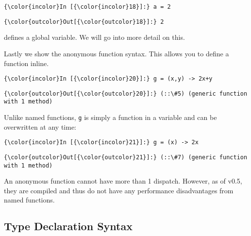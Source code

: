 \documentclass[11pt]{article}
\begin{document}
    \begin{Verbatim}[commandchars=\\\{\}]
{\color{incolor}In [{\color{incolor}18}]:} a = 2
\end{Verbatim}

            \begin{Verbatim}[commandchars=\\\{\}]
{\color{outcolor}Out[{\color{outcolor}18}]:} 2
\end{Verbatim}
        
    defines a global variable. We will go into more detail on this.

Lastly we show the anonymous function syntax. This allows you to define
a function inline.

    \begin{Verbatim}[commandchars=\\\{\}]
{\color{incolor}In [{\color{incolor}20}]:} g = (x,y) -> 2x+y
\end{Verbatim}

            \begin{Verbatim}[commandchars=\\\{\}]
{\color{outcolor}Out[{\color{outcolor}20}]:} (::\#5) (generic function with 1 method)
\end{Verbatim}
        
    Unlike named functions, \texttt{g} is simply a function in a variable
and can be overwritten at any time:

    \begin{Verbatim}[commandchars=\\\{\}]
{\color{incolor}In [{\color{incolor}21}]:} g = (x) -> 2x
\end{Verbatim}

            \begin{Verbatim}[commandchars=\\\{\}]
{\color{outcolor}Out[{\color{outcolor}21}]:} (::\#7) (generic function with 1 method)
\end{Verbatim}
        
    An anonymous function cannot have more than 1 dispatch. However, as of
v0.5, they are compiled and thus do not have any performance
disadvantages from named functions.

    \subsection{Type Declaration Syntax}\label{type-declaration-syntax}
\end{document}
